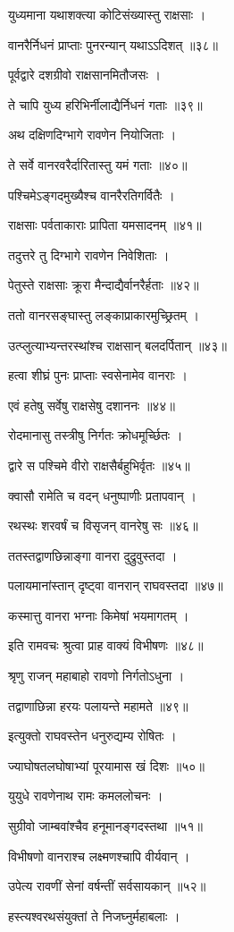 युध्यमाना यथाशक्त्या कोटिसंख्यास्तु राक्षसाः ।

वानरैर्निधनं प्राप्ताः पुनरन्यान् यथाऽऽदिशत् ॥३८॥

पूर्वद्वारे दशग्रीवो राक्षसानमितौजसः ।

ते चापि युध्य हरिभिर्नीलाद्यैर्निधनं गताः ॥३९॥

अथ दक्षिणदिग्भागे रावणेन नियोजिताः ।

ते सर्वे वानरवरैर्दारितास्तु यमं गताः ॥४०॥

पश्चिमेऽङ्गदमुख्यैश्च वानरैरतिगर्वितैः ।

राक्षसाः पर्वताकाराः प्रापिता यमसादनम् ॥४१॥

तदुत्तरे तु दिग्भागे रावणेन निवेशिताः ।

पेतुस्ते राक्षसाः क्रूरा मैन्दाद्यैर्वानरैर्हताः ॥४२॥

ततो वानरसङ्घास्तु लङ्काप्राकारमुच्छ्रितम् ।

उत्प्लुत्याभ्यन्तरस्थांश्च राक्षसान् बलदर्पितान् ॥४३॥

हत्वा शीघ्रं पुनः प्राप्ताः स्वसेनामेव वानराः ।

एवं हतेषु सर्वेषु राक्षसेषु दशाननः ॥४४॥

रोदमानासु तस्त्रीषु निर्गतः क्रोधमूर्च्छितः ।

द्वारे स पश्चिमे वीरो राक्षसैर्बहुभिर्वृतः ॥४५॥

क्वासौ रामेति च वदन् धनुष्पाणीः प्रतापवान् ।

रथस्थः शरवर्षं च विसृजन् वानरेषु सः ॥४६॥

ततस्तद्वाणछिन्नाङ्गा वानरा दुद्रुवुस्तदा ।

पलायमानांस्तान् दृष्ट्वा वानरान् राघवस्तदा ॥४७॥

कस्मात्तु वानरा भग्नाः किमेषां भयमागतम् ।

इति रामवचः श्रुत्वा प्राह वाक्यं विभीषणः ॥४८॥

श्रृणु राजन् महाबाहो रावणो निर्गतोऽधुना ।

तद्वाणाछिन्ना हरयः पलायन्ते महामते ॥४९॥

इत्युक्तो राघवस्तेन धनुरुद्यम्य रोषितः ।

ज्याघोषतलघोषाभ्यां पूरयामास खं दिशः ॥५०॥

युयुधे रावणेनाथ रामः कमललोचनः ।

सुग्रीवो जाम्बवांश्चैव हनूमानङ्गदस्तथा ॥५१॥

विभीषणो वानराश्च लक्ष्मणश्चापि वीर्यवान् ।

उपेत्य रावणीं सेनां वर्षन्तीं सर्वसायकान् ॥५२॥

हस्त्यश्वरथसंयुक्तां ते निजघ्नुर्महाबलाः ।

